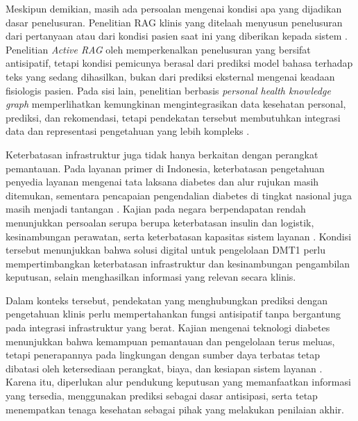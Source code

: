 Meskipun demikian, masih ada persoalan mengenai kondisi apa yang dijadikan dasar penelusuran. Penelitian RAG klinis yang ditelaah menyusun penelusuran dari pertanyaan
atau dari kondisi pasien saat ini yang diberikan kepada sistem \parencite{kresevic2024,lee2024,wang2024}. Penelitian \textit{Active RAG} oleh \textcite{jiang2023} memperkenalkan 
penelusuran yang bersifat antisipatif, tetapi kondisi pemicunya berasal dari prediksi model bahasa terhadap teks yang sedang dihasilkan, bukan dari prediksi eksternal mengenai 
keadaan fisiologis pasien. Pada sisi lain, penelitian berbasis \textit{personal health knowledge graph} memperlihatkan kemungkinan mengintegrasikan data 
kesehatan personal, prediksi, dan rekomendasi, tetapi pendekatan tersebut membutuhkan integrasi data dan representasi pengetahuan yang lebih kompleks \parencite{rad2024}.

Keterbatasan infrastruktur juga tidak hanya berkaitan dengan perangkat pemantauan. Pada layanan primer di Indonesia, keterbatasan pengetahuan penyedia layanan mengenai tata 
laksana diabetes dan alur rujukan masih ditemukan, sementara pencapaian pengendalian diabetes di tingkat nasional juga masih menjadi tantangan \parencite{hustrini2026,muharram2025}. 
Kajian pada negara berpendapatan rendah menunjukkan persoalan serupa berupa keterbatasan insulin dan logistik, kesinambungan perawatan, serta keterbatasan kapasitas sistem 
layanan \parencite{owusu2024}. Kondisi tersebut menunjukkan bahwa solusi digital untuk pengelolaan DMT1 perlu mempertimbangkan keterbatasan infrastruktur dan kesinambungan 
pengambilan keputusan, selain menghasilkan informasi yang relevan secara klinis.

Dalam konteks tersebut, pendekatan yang menghubungkan prediksi dengan pengetahuan klinis perlu mempertahankan fungsi antisipatif tanpa bergantung pada integrasi infrastruktur 
yang berat. Kajian mengenai teknologi diabetes menunjukkan bahwa kemampuan pemantauan dan pengelolaan terus meluas, tetapi penerapannya pada lingkungan dengan sumber daya
terbatas tetap dibatasi oleh ketersediaan perangkat, biaya, dan kesiapan sistem layanan \parencite{samajdar2025}. Karena itu, diperlukan alur 
pendukung keputusan yang memanfaatkan informasi yang tersedia, menggunakan prediksi sebagai dasar antisipasi, serta tetap menempatkan tenaga kesehatan sebagai pihak yang 
melakukan penilaian akhir.

